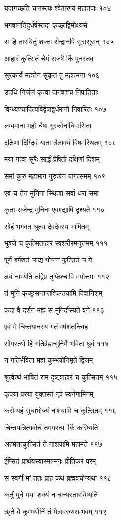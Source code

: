 यदागच्छति चागस्त्यः श्वेतारण्यं महातपाः १०४

भगवानतिदुर्धर्षस्तदा कृच्छ्राद्विमोक्ष्यसे

स हि तारयितुं शक्तः सेन्द्रानपि सुरासुरान् १०५

आहारं कुत्सितं चेमं राजर्षे किं पुनस्तव

सुरकार्यं महत्तेन सुकृतं तु महात्मना १०६

उदधिं निर्जलं कृत्वा दानवाश्च निपातिताः

विन्ध्यश्चादित्यविद्वेषाद्वर्धमानो निवारितः १०७

लम्बमाना मही चैषा गुरुत्वेनाधिवासिता

दक्षिणा दिग्दिवं याता त्रैलाक्यं विषमस्थितम् १०८

मया गत्वा सुरैः सार्द्धं प्रेषितो दक्षिणां दिशम्

समां कुरु महाभाग गुरुत्वेन जगत्समम् १०९

एवं च तेन मुनिना स्थित्वा सर्वा धरा समा

कृता राजेन्द्र मुनिना एवमद्यापि दृश्यते ११०

सोहं भगवत श्रुत्वा देवदेवस्य भाषितम्

भुञ्जे च कुत्सिताहारं स्वशरीरमनुत्तमम् १११

पूर्णं वर्षशतं चाद्य भोजनं कुत्सितं च मे

क्षयं नाभ्येति तद्विप्र तृप्तिश्चापि ममोत्तमा ११२

तं मुनिं कृच्छ्रसन्तप्तश्चिन्तयामि दिवानिशम्

कदा वै दर्शनं मह्यं स मुनिर्दास्यते वने ११३

एवं मे चिन्तयानस्य गतं वर्षशतन्त्विह

सोगस्त्यो हि गतिर्ब्रह्मन्मुनिर्मे भविता ध्रुवं ११४

न गतिर्भविता मह्यं कुम्भयोनिमृते द्विजम्

श्रुत्वेत्थं भाषितं राम दृष्ट्वाहारं च कुत्सितम् ११५

कृपया परया युक्तस्तं नृपं स्वर्गगामिनम्

करोम्यहं सुधाभोज्यं नाशयामि च कुत्सितम् ११६

चिन्तयन्नित्यवोचं तमगस्त्यः किं करिष्यति

अहमेतत्कुत्सितं ते नाशयामि महामते ११७

ईप्सितं प्रार्थयस्वास्मान्मनः प्रीतिकरं परम्

स स्वर्गी मां ततः प्राह कथं ब्रह्मवचोन्यथा ११८

कर्तुं मुने मया शक्यं न चान्यस्तारयिष्यति

ॠते वै कुम्भयोनिं तं मैत्रावरुणसम्भवम् ११९

